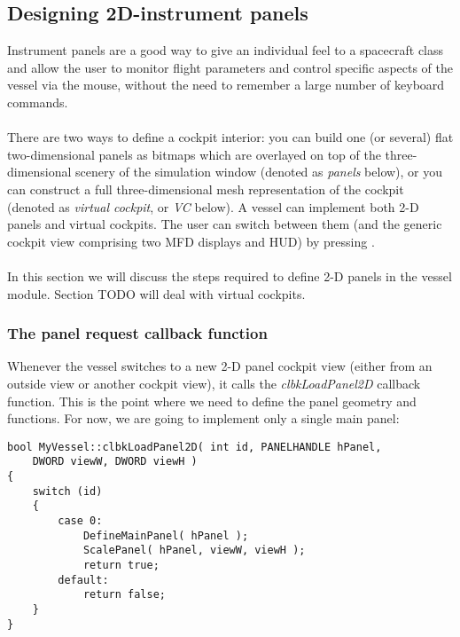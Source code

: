 \documentclass[Orbiter Developer Manual.tex]{subfiles}
\begin{document}
\subsection{Designing 2D-instrument panels}
Instrument panels are a good way to give an individual feel to a spacecraft class and allow the user to monitor flight parameters and control specific aspects of the vessel via the mouse, without the need to remember a large number of keyboard commands.\\
\\
There are two ways to define a cockpit interior: you can build one (or several) flat two-dimensional panels as bitmaps which are overlayed on top of the three-dimensional scenery of the simulation window (denoted as \textit{panels} below), or you can construct a full three-dimensional mesh representation of the cockpit (denoted as \textit{virtual cockpit}, or \textit{VC} below). A vessel can implement both 2-D panels and virtual cockpits. The user can switch between them (and the generic cockpit view comprising two MFD displays and HUD) by pressing .\\
\\
In this section we will discuss the steps required to define 2-D panels in the vessel module. Section TODO will deal with virtual cockpits.

\subsubsection{The panel request callback function}
Whenever the vessel switches to a new 2-D panel cockpit view (either from an outside view or another cockpit view), it calls the \textit{clbkLoadPanel2D} callback function. This is the point where we need to define the panel geometry and functions. For now, we are going to implement only a single main panel:

\begin{lstlisting}
bool MyVessel::clbkLoadPanel2D( int id, PANELHANDLE hPanel,
	DWORD viewW, DWORD viewH )
{
	switch (id)
	{
		case 0: 
			DefineMainPanel( hPanel );
			ScalePanel( hPanel, viewW, viewH );
			return true;
		default:
			return false;
	}
}
\end{lstlisting}
\end{document}
